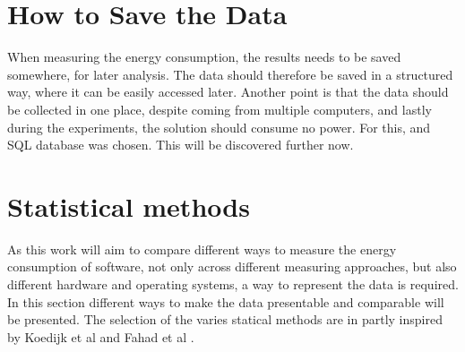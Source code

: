 \section{How to Save the Data}\label{sec:save_data}

When measuring the energy consumption, the results needs to be saved somewhere, for later analysis. The data should therefore be saved in a structured way, where it can be easily accessed later. Another point is that the data should be collected in one place, despite coming from multiple computers, and lastly during the experiments, the solution should consume no power. For this, and SQL database was chosen. This will be discovered further now.






\section{Statistical methods}\label{sec:stat}

As this work will aim to compare different ways to measure the energy consumption of software, not only across different measuring approaches, but also different hardware and operating systems, a way to represent the data is required. In this section different ways to make the data presentable and comparable will be presented. The selection of the varies statical methods are in partly inspired by Koedijk et al\cite{koedijk2022finding} and Fahad et al \cite{fahad2019comparative}.










